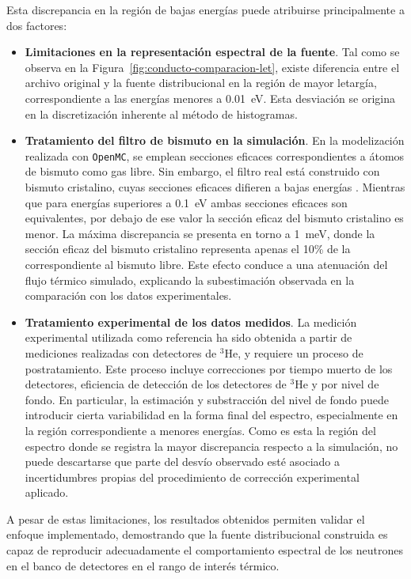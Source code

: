 Esta discrepancia en la región de bajas energías puede atribuirse principalmente a dos factores:

\begin{itemize}
\item \textbf{Limitaciones en la representación espectral de la fuente}. Tal como se observa en la Figura~\ref{fig:conducto-comparacion-let}, existe diferencia entre el archivo original y la fuente distribucional en la región de mayor letargía, correspondiente a las energías menores a 0.01~eV. Esta desviación se origina en la discretización inherente al método de histogramas.
\item \textbf{Tratamiento del filtro de bismuto en la simulación}. En la modelización realizada con \texttt{OpenMC}, se emplean secciones eficaces correspondientes a átomos de bismuto como gas libre. Sin embargo, el filtro real está construido con bismuto cristalino, cuyas secciones eficaces difieren a bajas energías \cite{Mishra2006PULSTAR}. Mientras que para energías superiores a 0.1~eV ambas secciones eficaces son equivalentes, por debajo de ese valor la sección eficaz del bismuto cristalino es menor. La máxima discrepancia se presenta en torno a 1~meV, donde la sección eficaz del bismuto cristalino representa apenas el 10\% de la correspondiente al bismuto libre. Este efecto conduce a una atenuación del flujo térmico simulado, explicando la subestimación observada en la comparación con los datos experimentales.
\item \textbf{Tratamiento experimental de los datos medidos}. La medición experimental utilizada como referencia ha sido obtenida a partir de mediciones realizadas con detectores de ${}^3$He, y requiere un proceso de postratamiento. Este proceso incluye correcciones por tiempo muerto de los detectores, eficiencia de detección de los detectores de ${}^3$He y por nivel de fondo. En particular, la estimación y substracción del nivel de fondo puede introducir cierta variabilidad en la forma final del espectro, especialmente en la región correspondiente a menores energías. Como es esta la región del espectro donde se registra la mayor discrepancia respecto a la simulación, no puede descartarse que parte del desvío observado esté asociado a incertidumbres propias del procedimiento de corrección experimental aplicado.
\end{itemize}

A pesar de estas limitaciones, los resultados obtenidos permiten validar el enfoque implementado, demostrando que la fuente distribucional construida es capaz de reproducir adecuadamente el comportamiento espectral de los neutrones en el banco de detectores en el rango de interés térmico.
